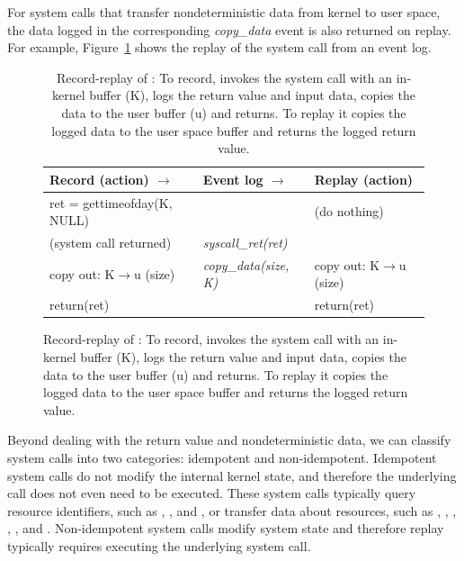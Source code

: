 \begin{table}[]
For system calls that transfer nondeterministic data from kernel to
user space, the data logged in the corresponding {\em copy\_data}
event is also returned on replay.  For example,
Figure~\ref{scribe:fig:recplay} shows the replay of the  
system call from an event log.

\begin{figure}[t]
  \small
  \begin{center}
  \begin{tabular}{lll}

    \hline	

    {\bf Record (action) \hfill $\rightarrow$ }
      & {\bf Event log \hfill $\rightarrow$ }
        & {\bf Replay (action)}
            \\

    \hline	

    ret = gettimeofday(K, NULL)
      &
        & (do nothing)
            \\

    (system call returned)
      & {\em syscall\_ret(ret)}
        &
            \\

    copy out: K$\rightarrow$u (size)
      & {\em copy\_data(size, K)}
        & copy out: K$\rightarrow$u (size)
            \\

    return(ret)
      &
        & return(ret)
            \\

    \hline	

  \end{tabular}
  \end{center}

  \caption{Record-replay of :
    { 
      To record, \scribe{} invokes the system call with an in-kernel
      buffer (K), logs the return value and input data, copies the
      data to the user buffer (u) and returns. To replay it copies
      the logged data to the user space buffer and returns the logged
      return value.
    }
  }
  \label{scribe:fig:recplay}
\end{figure}

Beyond dealing with the return value and nondeterministic data, we can
classify system calls into two categories: idempotent and non-idempotent.
Idempotent system calls do not modify the internal kernel state, and
therefore the underlying call does not even need to be executed. These
system calls typically query resource identifiers, such
as , ,  and , or 
transfer data about resources, such as , , 
, , ,
and .  Non-idempotent system calls modify system state
and therefore replay typically requires executing the underlying
system call. 


\end{table}
